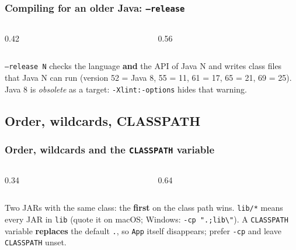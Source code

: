 \documentclass[aspectratio=169,10pt,compress]{beamer}
\begin{document}
\begin{frame}[t,fragile] \frametitle{Compiling for an older Java: \texttt{--release}}
  \begin{columns}[T]
    \begin{column}{0.42\textwidth}
    \end{column}
    \begin{column}{0.56\textwidth}
    \end{column}
  \end{columns}

  \vspace{0.1em}
  \small \texttt{--release N} checks the language \textbf{and} the API of Java N and writes class files that Java N can run
  (version 52 = Java 8, 55 = 11, 61 = 17, 65 = 21, 69 = 25).
  Java 8 is \emph{obsolete} as a target: \texttt{-Xlint:-options} hides that warning.
\end{frame}


\subsection[Order]{Order, wildcards, CLASSPATH}




\begin{frame}[t,fragile] \frametitle{Order, wildcards and the \texttt{CLASSPATH} variable}
  \begin{columns}[T]
    \begin{column}{0.34\textwidth}
    \end{column}
    \begin{column}{0.64\textwidth}
    \end{column}
  \end{columns}

  \vspace{0.1em}
  \small Two JARs with the same class: the \textbf{first} on the class path wins. \texttt{lib/*} means every JAR in \texttt{lib}
  (quote it on macOS; Windows: \texttt{-cp ".;lib\textbackslash *"}). A \texttt{CLASSPATH} variable \textbf{replaces} the default \texttt{.},
  so \texttt{App} itself disappears; prefer \texttt{-cp} and leave \texttt{CLASSPATH} unset.
\end{frame}
\end{document}
